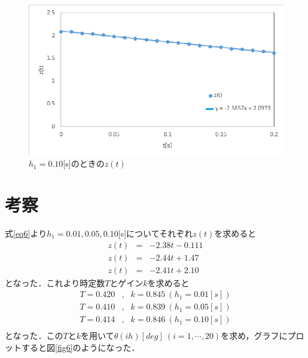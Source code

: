 \documentclass[11pt,a4paper]{jsarticle}
\begin{document}
\begin{figure}[htb]
 \begin{center}
  \includegraphics[scale = 1]{./picture/graph3.eps}
 \end{center}
 \caption{$h_1 = 0.10$[s]のときの$z(t)$}
 \label{fig5}
\end{figure}

\newpage

\section{考察}
式\ref{eq6}より$h_1 = 0.01,0.05,0.10$[s]についてそれぞれ$z(t)$を求めると
\begin{eqnarray}
 z(t) & = & -2.38t - 0.111 \\
 z(t) & = & -2.44t + 1.47 \\
 z(t) & = & -2.41t + 2.10 
\end{eqnarray}
となった．これより時定数$T$とゲイン$k$を求めると
\begin{eqnarray*}
 T = 0.420 & , & k = 0.845 \ (h_1 = 0.01[s]) \\
 T = 0.410 & , & k = 0.839 \ (h_1 = 0.05[s]) \\
 T = 0.414 & , & k = 0.846 \ (h_1 = 0.10[s]) \\
\end{eqnarray*}
となった．この$T$と$k$を用いて$\theta(ih)[deg] \ (i = 1,\cdots,20)$を求め，グラフにプロットすると図\ref{fig6}のようになった．
\end{document}

